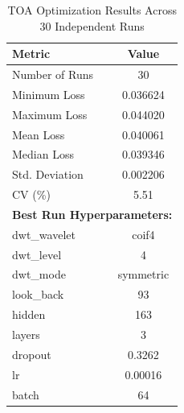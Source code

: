 \begin{table}[htbp]
\centering
\caption{TOA Optimization Results Across 30 Independent Runs}
\label{tab:toa_results}
\begin{tabular}{lc}
\hline
\textbf{Metric} & \textbf{Value} \\
\hline
Number of Runs & 30 \\
Minimum Loss   & 0.036624 \\
Maximum Loss   & 0.044020 \\
Mean Loss      & 0.040061 \\
Median Loss    & 0.039346 \\
Std. Deviation & 0.002206 \\
CV (\%)       & 5.51 \\
\hline
\multicolumn{2}{l}{\textbf{Best Run Hyperparameters:}} \\
dwt\_wavelet   & coif4 \\
dwt\_level     & 4 \\
dwt\_mode      & symmetric \\
look\_back     & 93 \\
hidden         & 163 \\
layers         & 3 \\
dropout        & 0.3262 \\
lr             & 0.00016 \\
batch          & 64 \\
\hline
\end{tabular}
\end{table}
